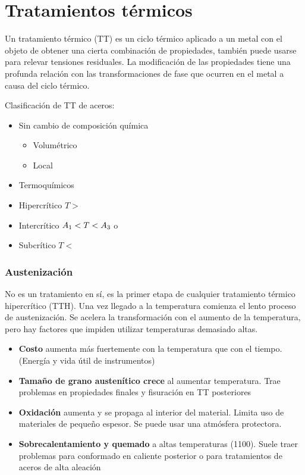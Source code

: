 \part{Tratamientos térmicos}
Un tratamiento térmico (TT) es un ciclo térmico aplicado a un metal con el objeto de obtener una cierta combinación de propiedades, también puede usarse para relevar tensiones residuales. La modificación de las propiedades tiene una profunda relación con las transformaciones de fase que ocurren en el metal a causa del ciclo térmico.

Clasificación de TT de aceros:
\begin{itemize}
    \item Sin cambio de composición química
    \begin{itemize}
        \item Volumétrico
        \item Local
    \end{itemize}
    \item Termoquímicos
    \item Hipercrítico $T>$\Athree~
    \item Intercrítico $A_{1}<T<A_{3}$ o \Acm~
    \item Subcrítico $T<$ \Aone~
\end{itemize}



\section{Austenización}
No es un tratamiento en sí, es la primer etapa de cualquier tratamiento térmico hipercrítico (TTH). Una vez llegado a la temperatura \Athree{} comienza el lento proceso de austenización. Se acelera la transformación con el aumento de la temperatura, pero hay factores que impiden utilizar temperaturas demasiado altas.

\begin{itemize}
    \item \textbf{Costo} aumenta más fuertemente con la temperatura que con el tiempo. (Energía y vida útil de instrumentos)
    \item \textbf{Tamaño de grano austenítico crece} al aumentar temperatura. Trae problemas en propiedades finales y fisuración en TT posteriores
    \item \textbf{Oxidación} aumenta y se propaga al interior del material. Limita uso de materiales de pequeño espesor. Se puede usar una atmósfera protectora.
    \item \textbf{Sobrecalentamiento y quemado} a altas temperaturas (1100\grad). Suele traer problemas para conformado en caliente posterior o para tratamientos de aceros de alta aleación
\end{itemize}

